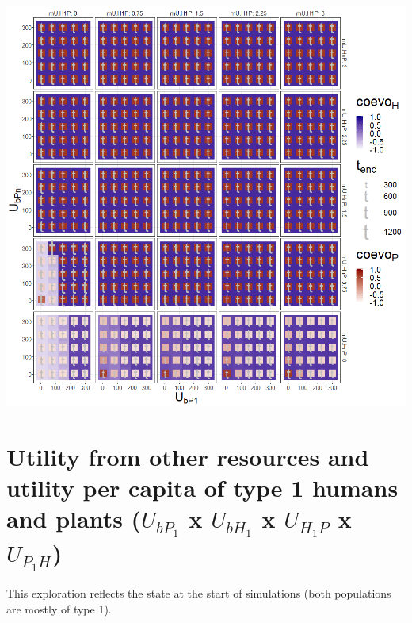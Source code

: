 \documentclass[]{book}
\begin{document}
\newpage

\includegraphics[width=1\linewidth]{plots/4_fourPar-U.bP-mU.HP_plot}

\newpage

\hypertarget{utility-from-other-resources-and-utility-per-capita-of-type-1-humans-and-plants-u_bp_1-x-u_bh_1-x-baru_h_1p-x-baru_p_1h}{%
\section{\texorpdfstring{Utility from other resources and utility per capita of type 1 humans and plants (\(U_{bP_{1}}\) x \(U_{bH_{1}}\) x \(\bar{U}_{H_{1}P}\) x \(\bar{U}_{P_{1}H}\))}{Utility from other resources and utility per capita of type 1 humans and plants (U\_\{bP\_\{1\}\} x U\_\{bH\_\{1\}\} x \textbackslash{}bar\{U\}\_\{H\_\{1\}P\} x \textbackslash{}bar\{U\}\_\{P\_\{1\}H\})}}\label{utility-from-other-resources-and-utility-per-capita-of-type-1-humans-and-plants-u_bp_1-x-u_bh_1-x-baru_h_1p-x-baru_p_1h}}


This exploration reflects the state at the start of simulations (both populations are mostly of type 1).
\end{document}

